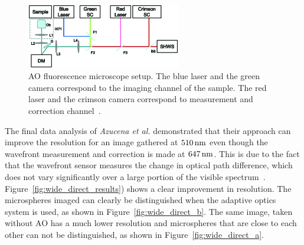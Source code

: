 \begin{figure}[htbp]
	\centering
			\includegraphics[width=0.60\textwidth]{images/wide_direct_setup}
		\caption{AO fluorescence microscope setup. The blue laser and the green camera correspond to the imaging channel of the sample. The red laser and the crimson camera correspond to measurement and correction channel~\cite{wide_directSensing_microscope}.}
	\label{fig:Setup_widefield_direct}
\end{figure}

The final data analysis of \emph{Azucena et al.}  demonstrated that their approach can improve the resolution for an image gathered at $\unit[510]{nm}$ even though the wavefront measurement and correction is made at $\unit[647]{nm}$. This is due to the fact that the wavefront sensor measures the change in optical path difference, which does not vary significantly over a large portion of the visible spectrum~\cite{wide_directSensing_microscope}. Figure~\ref{fig:wide_direct_results}) shows a clear improvement in resolution. The microspheres imaged can clearly be distinguished when the adaptive optics system is used, as shown in Figure~\ref{fig:wide_direct_b}. The same image, taken without AO has a much lower resolution and microspheres that are close to each other can not be distinguished, as shown in Figure~\ref{fig:wide_direct_a}.

